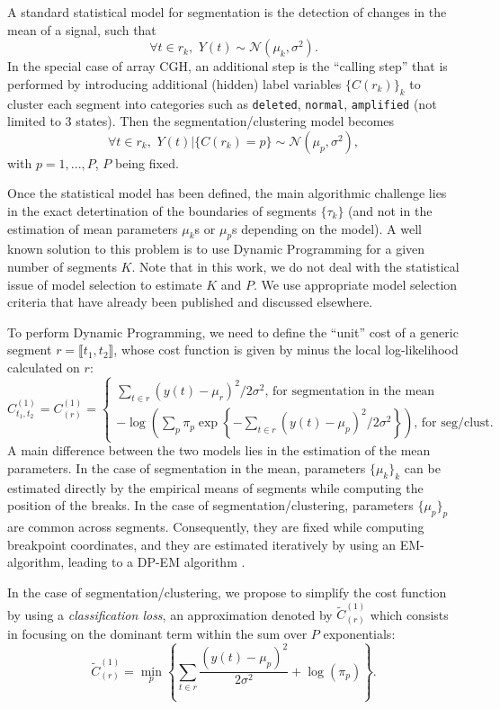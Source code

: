 \documentclass{llncs}
\begin{document}
A standard statistical model for segmentation is the detection of changes in the mean of a signal, such that $$\forall t \in r_k, \,\, Y(t)\sim \mathcal{N}(\mu_k,\sigma^2).$$ In the special case of array CGH, an additional step is the ``calling step'' that is performed by introducing additional (hidden) label variables $\{C(r_k)\}_k$ to cluster each segment into categories such as \texttt{deleted}, \texttt{normal}, \texttt{amplified} (not limited to 3 states). Then the segmentation/clustering model becomes  $$\forall t \in r_k, \,\, Y(t)|\{C(r_k)=p\} \sim \mathcal{N}(\mu_p,\sigma^2),$$ with $p=1,...,P$, $P$ being fixed.

Once the statistical model has been defined, the main algorithmic challenge lies in the exact detertination of the boundaries of segments $\{\tau_k\}$ (and not in the estimation of mean parameters $\mu_k$s or $\mu_p$s depending on the model). A well known solution to this problem is to use Dynamic Programming for a given number of segments $K$. Note that in this work, we do not deal with the statistical issue of model selection to estimate $K$ and $P$. We use appropriate model selection criteria that have already been published and discussed elsewhere.

To perform Dynamic Programming, we need to define the ``unit'' cost of a generic segment $r = \llbracket t_1, t_2 \rrbracket$, whose cost function is given by minus the local log-likelihood calculated on $r$:
$$ C_{t_1, t_2}^{(1)} =C_{(r)}^{(1)} = 
\begin{cases}
\sum_{t \in r} (y(t) - \mu_r)^2/2 \sigma^2 \text{, for segmentation in the mean}  \\
-\log\left(\sum_p \pi_p \exp \left\{ - \sum_{t \in r} (y(t) - \mu_p)^2 / 2 \sigma^2 \right\}\right) \text{, for seg/clust}.
\end{cases}
$$ 
A main difference between the two models lies in the estimation of the mean parameters. In the case of segmentation in the mean, parameters $\{\mu_k\}_k$ can be estimated directly by the empirical means of segments while computing the position of the breaks. In the case of segmentation/clustering, parameters $\{\mu_p\}_p$ are common across segments. Consequently, they are fixed while computing breakpoint coordinates, and they are estimated iteratively by using an EM-algorithm, leading to a DP-EM algorithm \cite{picard_2007}. 

In the case of segmentation/clustering, we propose to simplify the cost function by using a \textit{classification loss}, an approximation denoted by $\widetilde{C}_{(r)}^{(1)}$ which consists in focusing on the dominant term within the sum over $P$ exponentials:
\begin{equation}
\label{Eq:approx}
\widetilde{C}_{(r)}^{(1)}= \min_p \left\{ \sum_{t \in r}\frac{(y(t) - \mu_p)^2} {2\sigma^2 } + \log(\pi_p)\right\}.
\end{equation}
\end{document}
